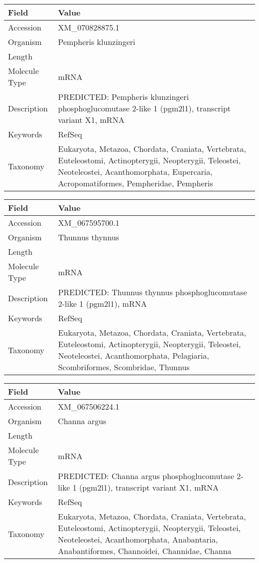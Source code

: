 \documentclass[10pt]{article}
\begin{document}
{\footnotesize
\begin{longtable}{>{\raggedright\arraybackslash}p{4.5cm} >{\raggedright\arraybackslash}p{11.5cm}}
\textbf{Field} & \textbf{Value} \\
\hline
Accession & XM\_070828875.1 \\
Organism & Pempheris klunzingeri \\
Length & 2199 \\
Molecule Type & mRNA \\
Description & PREDICTED: Pempheris klunzingeri phosphoglucomutase 2-like 1 (pgm2l1), transcript variant X1, mRNA \\
Keywords & RefSeq \\
Taxonomy & Eukaryota, Metazoa, Chordata, Craniata, Vertebrata, Euteleostomi, Actinopterygii, Neopterygii, Teleostei, Neoteleostei, Acanthomorphata, Eupercaria, Acropomatiformes, Pempheridae, Pempheris \\
\end{longtable}
}

{\footnotesize
\begin{longtable}{>{\raggedright\arraybackslash}p{4.5cm} >{\raggedright\arraybackslash}p{11.5cm}}
\textbf{Field} & \textbf{Value} \\
\hline
Accession & XM\_067595700.1 \\
Organism & Thunnus thynnus \\
Length & 3745 \\
Molecule Type & mRNA \\
Description & PREDICTED: Thunnus thynnus phosphoglucomutase 2-like 1 (pgm2l1), mRNA \\
Keywords & RefSeq \\
Taxonomy & Eukaryota, Metazoa, Chordata, Craniata, Vertebrata, Euteleostomi, Actinopterygii, Neopterygii, Teleostei, Neoteleostei, Acanthomorphata, Pelagiaria, Scombriformes, Scombridae, Thunnus \\
\end{longtable}
}

{\footnotesize
\begin{longtable}{>{\raggedright\arraybackslash}p{4.5cm} >{\raggedright\arraybackslash}p{11.5cm}}
\textbf{Field} & \textbf{Value} \\
\hline
Accession & XM\_067506224.1 \\
Organism & Channa argus \\
Length & 3894 \\
Molecule Type & mRNA \\
Description & PREDICTED: Channa argus phosphoglucomutase 2-like 1 (pgm2l1), transcript variant X1, mRNA \\
Keywords & RefSeq \\
Taxonomy & Eukaryota, Metazoa, Chordata, Craniata, Vertebrata, Euteleostomi, Actinopterygii, Neopterygii, Teleostei, Neoteleostei, Acanthomorphata, Anabantaria, Anabantiformes, Channoidei, Channidae, Channa \\
\end{longtable}
}
\end{document}
